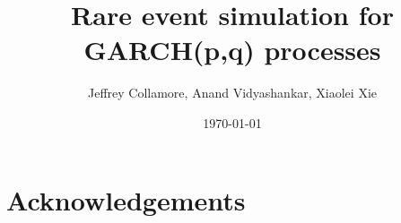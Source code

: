 \documentclass[11pt,a4]{amsart}
\begin{document}
\title{Rare event simulation for GARCH(p,q) processes}
\author{Jeffrey Collamore, Anand Vidyashankar, Xiaolei Xie}
\date{\today}


\maketitle


\section*{Acknowledgements}



\end{document}
